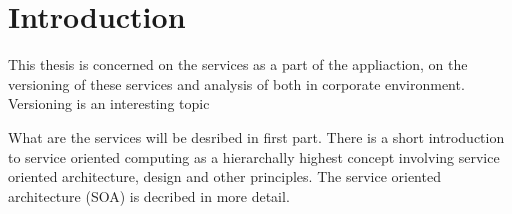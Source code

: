 \chapter{Introduction}
\label{chap:introduction}

This thesis is concerned on the services as a part of the appliaction, on the versioning of these services and analysis of both in corporate environment. Versioning is an interesting topic


What are the services will be desribed in first part. There is a short introduction to service oriented computing as a hierarchally highest concept involving service oriented architecture, design and other principles. The service oriented architecture (SOA) is decribed in more detail. %

